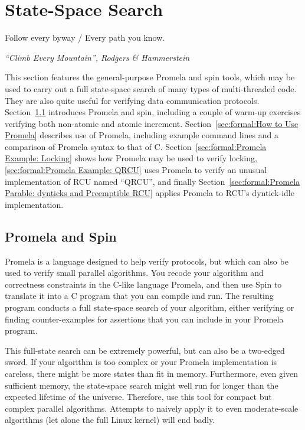 
\section{State-Space Search}
\label{sec:formal:State-Space Search}
%
\epigraph{Follow every byway / Every path you know.}
	 {\emph{``Climb Every Mountain'', Rodgers \& Hammerstein}}

This section features the general-purpose Promela and spin tools,
which may be used to carry out a full
state-space search of many types of multi-threaded code.
They are also quite useful for verifying data communication protocols.
Section~\ref{sec:formal:Promela and Spin}
introduces Promela and spin, including a couple of warm-up exercises
verifying both non-atomic and atomic increment.
Section~\ref{sec:formal:How to Use Promela}
describes use of Promela, including example command lines and a
comparison of Promela syntax to that of C.
Section~\ref{sec:formal:Promela Example: Locking}
shows how Promela may be used to verify locking,
\ref{sec:formal:Promela Example: QRCU}
uses Promela to verify an unusual implementation of RCU named ``QRCU'',
and finally
Section~\ref{sec:formal:Promela Parable: dynticks and Preemptible RCU}
applies Promela to RCU's dyntick-idle implementation.

\subsection{Promela and Spin}
\label{sec:formal:Promela and Spin}

Promela is a language designed to help verify protocols, but which
can also be used to verify small parallel algorithms.
You recode your algorithm and correctness constraints in the C-like
language Promela, and then use Spin to translate it into a C program
that you can compile and run.
The resulting program conducts a full state-space search of your
algorithm, either verifying or finding counter-examples for
assertions that you can include in your Promela program.

This full-state search can be extremely powerful, but can also be a two-edged
sword.
If your algorithm is too complex or your Promela implementation is
careless, there might be more states than fit in memory.
Furthermore, even given sufficient memory, the state-space search might
well run for longer than the expected lifetime of the universe.
Therefore, use this tool for compact but complex parallel algorithms.
Attempts to naively apply it to even moderate-scale algorithms (let alone
the full Linux kernel) will end badly.


